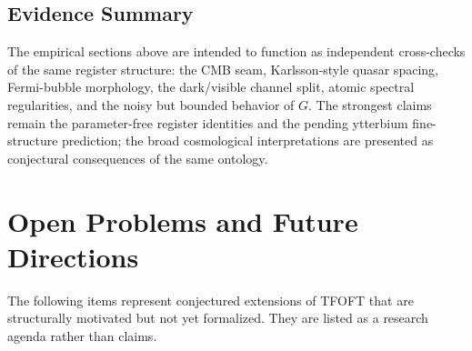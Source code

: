 \documentclass[11pt,a4paper]{article}
\begin{document}
\subsection{Evidence Summary}

The empirical sections above are intended to function as independent cross-checks of the same register structure: the CMB seam, Karlsson-style quasar spacing, Fermi-bubble morphology, the dark/visible channel split, atomic spectral regularities, and the noisy but bounded behavior of \(G\). The strongest claims remain the parameter-free register identities and the pending ytterbium fine-structure prediction; the broad cosmological interpretations are presented as conjectural consequences of the same ontology.


\section{Open Problems and Future Directions}
\label{sec:todo}

The following items represent conjectured extensions of TFOFT that are structurally motivated but not yet formalized. They are listed as a research agenda rather than claims.
\end{document}
